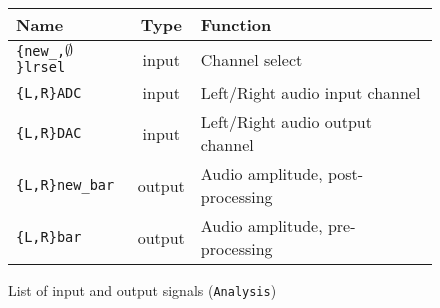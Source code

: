 \begin{figure}[h]
  \centering
  \caption{List of input and output signals (\texttt{Analysis})}
  \begin{tabular}{|l|c|l|}
    \hline
    Name & Type & Function \\    \hline
    \texttt{\{new\_,$\emptyset$\}lrsel} & input & Channel select \\    \hline
    \verb+{L,R}ADC+ & input & Left/Right audio input channel \\    \hline
    \verb+{L,R}DAC+ & input & Left/Right audio output channel \\    \hline
    \verb+{L,R}new_bar+ & output & Audio amplitude, post-processing\\    \hline
    \verb+{L,R}bar+ & output & Audio amplitude, pre-processing\\    \hline
  \end{tabular}
  \label{tab:analsig}
\end{figure}